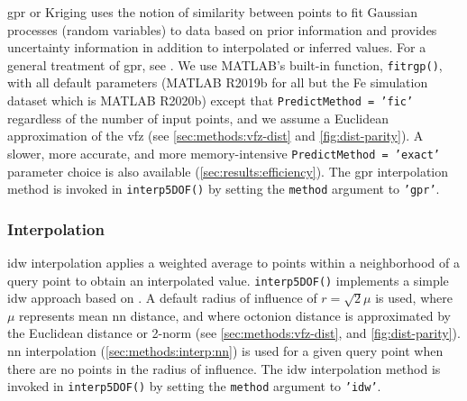 \documentclass[final,twocolumn,12pt]{elsarticle}
\newcommand{\inpt}{input}
\begin{document}

\Gls{gpr} or Kriging uses the notion of similarity between points to fit Gaussian processes (random variables) to data based on prior information and provides uncertainty information in addition to interpolated or inferred values. For a general treatment of \gls{gpr}, see \cite{rasmussenGaussianProcessesMachine2006}. We use MATLAB's built-in function, \texttt{fitrgp()}, with all default parameters (MATLAB R2019b for all but the Fe simulation dataset which is MATLAB R2020b) except that \texttt{PredictMethod = 'fic'} regardless of the number of \inpt{} points, and we assume a Euclidean approximation of the \gls{vfz} (see \cref{sec:methods:vfz-dist} and \cref{fig:dist-parity}). A slower, more accurate, and more memory-intensive \texttt{PredictMethod = 'exact'} parameter choice is also available (\cref{sec:results:efficiency}). The \gls{gpr} interpolation method is invoked in \texttt{interp5DOF()} by setting the \texttt{method} argument to \texttt{'gpr'}.

\subsubsection{ Interpolation}
\label{sec:methods:interp:idw}


\Gls{idw} interpolation applies a weighted average to points within a neighborhood of a query point to obtain an interpolated value. \texttt{interp5DOF()} implements a simple \gls{idw} approach based on \cite{tovarInverseDistanceWeight2020}. A default radius of influence of $r=\sqrt{2} \mu$ is used, where $\mu$ represents mean \gls{nn} distance, and where octonion distance is approximated by the Euclidean distance or 2-norm (see \cref{sec:methods:vfz-dist}, and \cref{fig:dist-parity}). \gls{nn} interpolation (\cref{sec:methods:interp:nn}) is used for a given query point when there are no points in the radius of influence. The \gls{idw} interpolation method is invoked in \texttt{interp5DOF()} by setting the \texttt{method} argument to \texttt{'idw'}.
\end{document}
